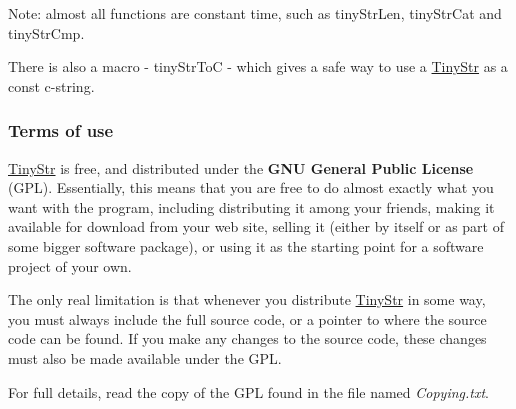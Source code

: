 Note\+: almost all functions are constant time, such as tiny\+Str\+Len, tiny\+Str\+Cat and tiny\+Str\+Cmp.

There is also a macro -\/ tiny\+Str\+ToC -\/ which gives a safe way to use a \hyperlink{unionTinyStr}{Tiny\+Str} as a const c-\/string.

\subsubsection*{Terms of use}

\hyperlink{unionTinyStr}{Tiny\+Str} is free, and distributed under the {\bfseries G\+NU General Public License} (G\+PL). Essentially, this means that you are free to do almost exactly what you want with the program, including distributing it among your friends, making it available for download from your web site, selling it (either by itself or as part of some bigger software package), or using it as the starting point for a software project of your own.

The only real limitation is that whenever you distribute \hyperlink{unionTinyStr}{Tiny\+Str} in some way, you must always include the full source code, or a pointer to where the source code can be found. If you make any changes to the source code, these changes must also be made available under the G\+PL.

For full details, read the copy of the G\+PL found in the file named {\itshape Copying.\+txt}. 